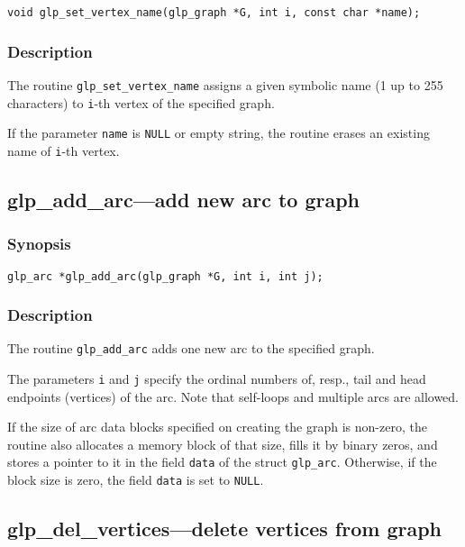 \documentclass[dvipdfm,11pt]{report}
\begin{document}
\begin{verbatim}
void glp_set_vertex_name(glp_graph *G, int i, const char *name);
\end{verbatim}

\subsubsection*{Description}

The routine \verb|glp_set_vertex_name| assigns a given symbolic name
(1 up to 255 characters) to \verb|i|-th vertex of the specified graph.

If the parameter \verb|name| is \verb|NULL| or empty string, the
routine erases an existing name of \verb|i|-th vertex.

\newpage

\subsection{glp\_add\_arc---add new arc to graph}

\subsubsection*{Synopsis}

\begin{verbatim}
glp_arc *glp_add_arc(glp_graph *G, int i, int j);
\end{verbatim}

\subsubsection*{Description}

The routine \verb|glp_add_arc| adds one new arc to the specified graph.

The parameters \verb|i| and \verb|j| specify the ordinal numbers of,
resp., tail and head endpoints (vertices) of the arc. Note that
self-loops and multiple arcs are allowed.

If the size of arc data blocks specified on creating the graph is
non-zero, the routine also allocates a memory block of that size, fills
it by binary zeros, and stores a pointer to it in the field \verb|data|
of the struct \verb|glp_arc|. Otherwise, if the block size is zero, the
field \verb|data| is set to \verb|NULL|.

\subsection{glp\_del\_vertices---delete vertices from graph}
\end{document}
